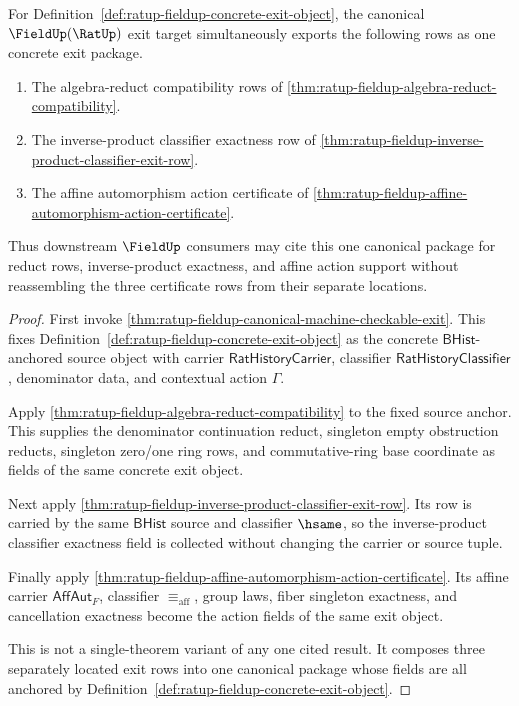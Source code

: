 \begin{theorem}
\label{thm:ratup-fieldup-canonical-exit-action-inverse-package}
For Definition~\ref{def:ratup-fieldup-concrete-exit-object}, the canonical
$\FieldUp(\RatUp)$ exit target simultaneously exports the following rows as one
concrete exit package.

\begin{enumerate}
\item The algebra-reduct compatibility rows of
\autoref{thm:ratup-fieldup-algebra-reduct-compatibility}.
\item The inverse-product classifier exactness row of
\autoref{thm:ratup-fieldup-inverse-product-classifier-exit-row}.
\item The affine automorphism action certificate of
\autoref{thm:ratup-fieldup-affine-automorphism-action-certificate}.
\end{enumerate}

Thus downstream $\FieldUp$ consumers may cite this one canonical package for
reduct rows, inverse-product exactness, and affine action support without
reassembling the three certificate rows from their separate locations.
\end{theorem}
\begin{proof}
First invoke
\autoref{thm:ratup-fieldup-canonical-machine-checkable-exit}. This fixes
Definition~\ref{def:ratup-fieldup-concrete-exit-object} as the concrete
$\mathsf{BHist}$-anchored source object with carrier
$\mathsf{RatHistoryCarrier}$, classifier $\mathsf{RatHistoryClassifier}$,
denominator data, and contextual action $\Gamma$.

Apply \autoref{thm:ratup-fieldup-algebra-reduct-compatibility} to the fixed
source anchor. This supplies the denominator continuation reduct, singleton
empty obstruction reducts, singleton zero/one ring rows, and commutative-ring
base coordinate as fields of the same concrete exit object.

Next apply \autoref{thm:ratup-fieldup-inverse-product-classifier-exit-row}. Its
row is carried by the same $\mathsf{BHist}$ source and classifier $\hsame$, so
the inverse-product classifier exactness field is collected without changing
the carrier or source tuple.

Finally apply
\autoref{thm:ratup-fieldup-affine-automorphism-action-certificate}. Its affine
carrier $\mathsf{AffAut}_F$, classifier $\equiv_{\mathrm{aff}}$, group laws,
fiber singleton exactness, and cancellation exactness become the action fields
of the same exit object.

This is not a single-theorem variant of any one cited result. It composes three
separately located exit rows into one canonical package whose fields are all
anchored by Definition~\ref{def:ratup-fieldup-concrete-exit-object}.
\end{proof}


